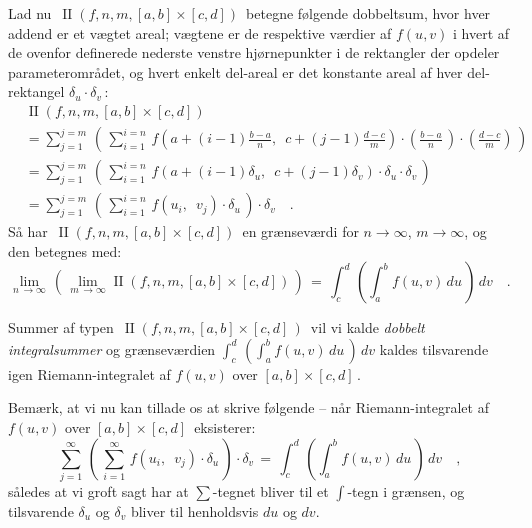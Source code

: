 \begin{theorem}
 Lad nu $\,\operatorname{II}(f, n, m, [a,b] \times [c,d])\,$ betegne følgende
 dobbeltsum, hvor hver addend er et vægtet areal; vægtene er de respektive værdier af $f(u,v)$ i
 hvert af de ovenfor definerede nederste venstre hjørnepunkter i de rektangler der opdeler parameterområdet, og hvert enkelt del-areal er det konstante areal af hver del-rektangel $\delta_{u} \cdot \delta_{v}\,$:
\begin{equation}\label{eqIIS}
\begin{aligned}
&\operatorname{II}(f, n, m, [a,b] \times [c,d]) \\
&= \sum_{j=1}^{j=m}\, \left(\,\sum_{i=1}^{i=n}\, f\left(a+ (i-1)\frac{b-a}{n}, \,\,\,
c+(j-1)\frac{d-c}{m}\right)\cdot \left(\frac{b-a}{n}\, \right)
 \cdot \left(\frac{d-c}{m} \right)\,\right)\\
 &= \sum_{j=1}^{j=m}\,
\left( \,\sum_{i=1}^{i=n}\, f\left(a+ (i-1)\delta_{u}, \,\,\,
c+(j-1)\delta_{v}\right)\cdot \delta_{u}  \cdot \delta_{v} \,\right) \\
&=\sum_{j=1}^{j=m}\, \left( \,\sum_{i=1}^{i=n}\, f\left(u_{i}, \,\,\,
v_{j}\right)\cdot \delta_{u} \,\right) \cdot \delta_{v}  \quad .
\end{aligned}
\end{equation}
Så har $\,\operatorname{II}(f, n, m, [a,b] \times [c,d])\,$ en grænseværdi for $n \to \infty$, $m \to \infty$, og den betegnes med:
\begin{equation} \label{eqDobbeltInt}
\lim_{n\, \to \infty}\, \left( \,\lim_{m\, \to \infty} \operatorname{II}(f,n,m,
[a, b]\times [c,d])\,\right) \, = \, \int_{c}^{d}\, \left(
\int_{a}^{b} f(u,v)\, du \, \right)\, dv \quad .
\end{equation}
\end{theorem}

Summer af typen $\,\operatorname{II}(f, n, m, [a,b]\times [c,d]\,)\,$ vil vi
kalde {\emph{dobbelt integralsummer}} og grænseværdien $\int_{c}^{d}\, \left(
\int_{a}^{b} f(u,v)\, du \, \right)\, dv $ kaldes tilsvarende igen Riemann-integralet af $f(u,v)$ over $[a, b]\times [c,d]\,$.

\begin{aha}
Bemærk, at vi nu kan tillade os at skrive følgende -- når Riemann-integralet af $f(u,v)$ over $[a, b]\times [c,d]\,$ eksisterer:
\begin{equation}
\sum_{j=1}^{\infty}\, \left( \,\sum_{i=1}^{\infty}\, f\left(u_{i}, \,\,\,
v_{j}\right)\cdot \delta_{u} \,\right) \cdot \delta_{v} \, = \, \int_{c}^{d}\, \left(
\int_{a}^{b} f(u,v)\, du \, \right)\, dv \quad ,
\end{equation}
således at vi groft sagt har at $\sum$-tegnet bliver til et $\int$-tegn i grænsen, og tilsvarende $\delta_{u}$ og $\delta_{v}$ bliver til henholdsvis $du$ og $dv$.
\end{aha}

